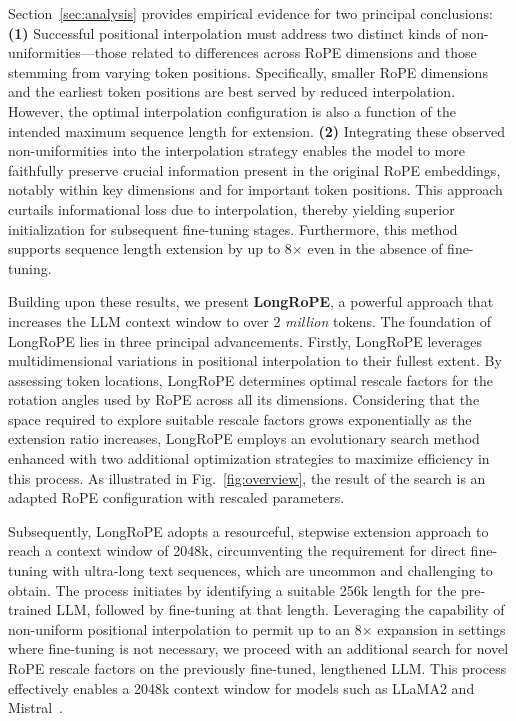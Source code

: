 Section~\ref{sec:analysis} provides empirical evidence for two principal conclusions: \textbf{(1)} Successful positional interpolation must address two distinct kinds of non-uniformities—those related to differences across RoPE dimensions and those stemming from varying token positions. Specifically, smaller RoPE dimensions and the earliest token positions are best served by reduced interpolation. However, the optimal interpolation configuration is also a function of the intended maximum sequence length for extension. \textbf{(2)} Integrating these observed non-uniformities into the interpolation strategy enables the model to more faithfully preserve crucial information present in the original RoPE embeddings, notably within key dimensions and for important token positions. This approach curtails informational loss due to interpolation, thereby yielding superior initialization for subsequent fine-tuning stages. Furthermore, this method supports sequence length extension by up to 8$\times$ even in the absence of fine-tuning.

Building upon these results, we present \textbf{LongRoPE}, a powerful approach that increases the LLM context window to over 2 \emph{million} tokens. The foundation of LongRoPE lies in three principal advancements. Firstly, LongRoPE leverages multidimensional variations in positional interpolation to their fullest extent. By assessing token locations, LongRoPE determines optimal rescale factors for the rotation angles used by RoPE across all its dimensions. Considering that the space required to explore suitable rescale factors grows exponentially as the extension ratio increases, LongRoPE employs an evolutionary search method enhanced with two additional optimization strategies to maximize efficiency in this process. As illustrated in Fig.~\ref{fig:overview}, the result of the search is an adapted RoPE configuration with rescaled parameters.

Subsequently, {LongRoPE} adopts a resourceful, stepwise extension approach to reach a context window of 2048k, circumventing the requirement for direct fine-tuning with ultra-long text sequences, which are uncommon and challenging to obtain. The process initiates by identifying a suitable 256k length for the pre-trained LLM, followed by fine-tuning at that length. Leveraging the capability of non-uniform positional interpolation to permit up to an 8$\times$ expansion in settings where fine-tuning is not necessary, we proceed with an additional search for novel RoPE rescale factors on the previously fine-tuned, lengthened LLM. This process effectively enables a 2048k context window for models such as LLaMA2 and Mistral~\cite{mistral}.

